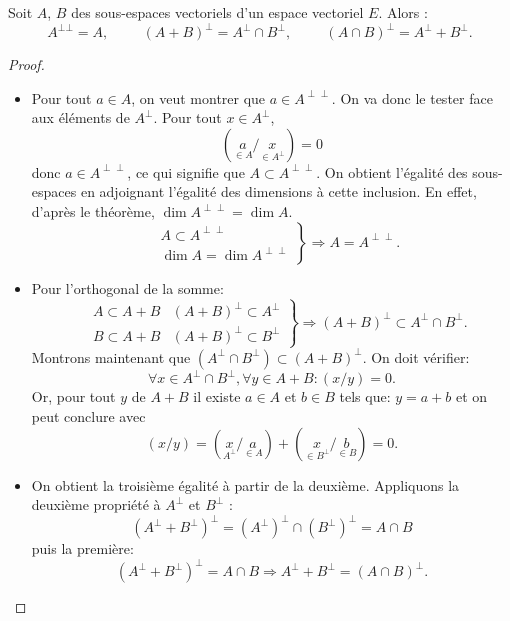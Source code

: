 \begin{prop}
 Soit $A$, $B$ des sous-espaces vectoriels d'un espace vectoriel $E$. Alors :
\begin{displaymath}
 A^{\bot \bot}=A ,\hspace{1cm} (A+B)^\bot = A^\bot \cap B^\bot, \hspace{1cm} (A\cap B)^\bot = A^\bot + B^\bot .
\end{displaymath}
\end{prop}
\begin{proof}
\begin{itemize}
\item Pour tout $a \in A$, on veut montrer que $a \in A^{\perp\perp}$. On va donc le tester face aux éléments de $A^{\perp}$. Pour tout $x \in A^{\perp}$, 
\begin{displaymath}
 (\underset{\in A}{a} / \underset{\in A^{\perp}}{x}) = 0
\end{displaymath}
donc $a \in A^{\perp\perp}$, ce qui signifie que $A \subset A^{\perp\perp}$.\newline
On obtient l'égalité des sous-espaces en adjoignant l'égalité des dimensions à cette inclusion. En effet, d'après le théorème, $\dim A^{\perp\perp} = \dim A$.
\begin{displaymath}
 \left.
\begin{aligned}
&A \subset A^{\perp\perp} \\
&\dim A = \dim A^{\perp \perp}
\end{aligned}
 \right\rbrace \Rightarrow A = A^{\perp \perp} .
\end{displaymath}
\item Pour l'orthogonal de la somme:
\begin{displaymath}
 \left. 
\begin{aligned}
&A \subset A + B & (A+B)^{\perp} \subset A^{\perp} \\
&B \subset A + B & (A+B)^{\perp} \subset B^{\perp}
\end{aligned}
\right\rbrace 
\Rightarrow (A+B)^{\perp} \subset A^{\perp} \cap B^{\perp} .
\end{displaymath}
Montrons maintenant que $( A^{\perp} \cap B^{\perp} ) \subset (A+B)^{\perp}$. On doit vérifier:
\[
\forall x \in A^{\perp} \cap B^{\perp}, \forall y \in A+B : (x/y) = 0 .
\]
Or, pour tout $y$ de $A+B$ il existe $a \in A$ et $b \in B$ tels que: $y = a + b$ et on peut conclure avec
\[
(x/y) = (\underset{A^{\perp}}{x}/\underset{\in A}{a}) + (\underset{\in B^{\perp}}{x} / \underset{\in B}{b}) = 0 .
\]
\item On obtient la troisième égalité à partir de la deuxième. Appliquons la deuxième propriété à $A^{\perp}$ et $B^{\perp}$ :
\[
(A^{\perp} + B^{\perp})^{\perp} = (A^{\perp})^{\perp} \cap (B^{\perp})^{\perp} = A \cap B
\]
puis la première:
\begin{displaymath}
(A^{\perp} + B^{\perp})^{\perp} = A \cap B 
 \Rightarrow A^{\perp} + B^{\perp} = (A \cap B)^{\perp} .
\end{displaymath}
\end{itemize}
\end{proof}
\newpage
